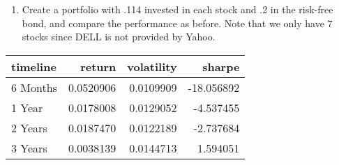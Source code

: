 \documentclass[11pt,]{article}
\providecommand{\tightlist}{%
\setlength{\itemsep}{0pt}\setlength{\parskip}{0pt}}
\begin{document}
\begin{enumerate}
\def\labelenumi{\arabic{enumi}.}
\setcounter{enumi}{4}
\tightlist
\item
  Create a portfolio with .114 invested in each stock and .2 in the
  risk-free bond, and compare the performance as before. Note that we
  only have 7 stocks since DELL is not provided by Yahoo.
\end{enumerate}

\begin{longtable}[]{@{}lrrr@{}}
\toprule
timeline & return & volatility & sharpe\tabularnewline
\midrule
\endhead
6 Months & 0.0520906 & 0.0109909 & -18.056892\tabularnewline
1 Year & 0.0178008 & 0.0129052 & -4.537455\tabularnewline
2 Years & 0.0187470 & 0.0122189 & -2.737684\tabularnewline
3 Years & 0.0038139 & 0.0144713 & 1.594051\tabularnewline
\bottomrule
\end{longtable}
\newpage
\singlespacing 
\end{document}
